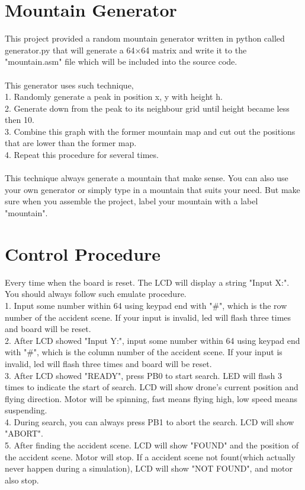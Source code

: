 \documentclass[a4paper, 12 pt]{report}
\begin{document}
\newpage

\section{Mountain Generator}
This project provided a random mountain generator written in python called generator.py that will generate a 64$\times$64 matrix and write it to the "mountain.asm" file which will be included into the source code.\\\\
This generator uses such technique,\\
1. Randomly generate a peak in position x, y with height h.\\
2. Generate down from the peak to its neighbour grid until height became less then 10.\\
3. Combine this graph with the former mountain map and cut out the positions that are lower than the former map.\\
4. Repeat this procedure for several times.\\\\
This technique always generate a mountain that make sense. You can also use your own generator or simply type in a mountain that suits your need. But make sure when you assemble the project, label your mountain with a label "mountain".
\newpage
\section{Control Procedure}
Every time when the board is reset. The LCD will display a string "Input X:".\\
You should always follow such emulate procedure.\\
1. Input some number within 64 using keypad end with "\#", which is the row number of the accident scene. If your input is invalid, led will flash three times and board will be reset.\\
2. After LCD showed "Input Y:", input some number within 64 using keypad end with "\#", which is the column number of the accident scene. If your input is invalid, led will flash three times and board will be reset.\\
3. After LCD showed "READY", press PB0 to start search. LED will flash 3 times to indicate the start of search. LCD will show drone's current position and flying direction. Motor will be spinning, fast means flying high, low speed means suspending.\\
4. During search, you can always press PB1 to abort the search. LCD will show "ABORT".\\
5. After finding the accident scene. LCD will show "FOUND" and the position of the accident scene. Motor will stop. If a accident scene not fount(which actually never happen during a simulation), LCD will show "NOT FOUND", and motor also stop.
\end{document}
